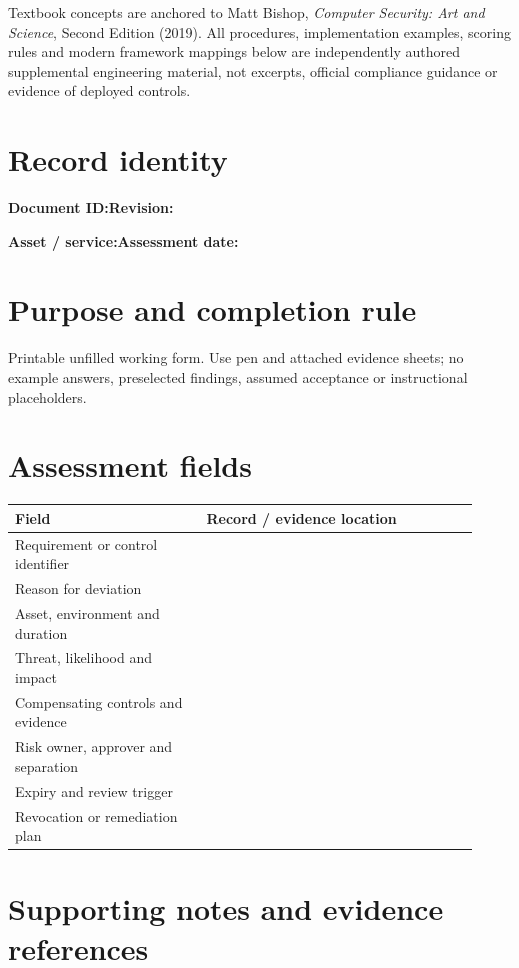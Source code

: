 \documentclass[10pt,letterpaper]{article}
\begin{document}
\makedoctocpage
\begin{notebox}
Textbook concepts are anchored to Matt Bishop, \emph{Computer Security: Art and Science}, Second Edition (2019). All procedures, implementation examples, scoring rules and modern framework mappings below are independently authored supplemental engineering material, not excerpts, official compliance guidance or evidence of deployed controls.
\end{notebox}
\section{Record identity}
\textbf{Document ID:}\enspace\hrulefill\quad\textbf{Revision:}\enspace\hrulefill
\par\medskip\textbf{Asset / service:}\enspace\hrulefill\quad\textbf{Assessment date:}\enspace\hrulefill
\section{Purpose and completion rule}
Printable unfilled working form. Use pen and attached evidence sheets; no example answers, preselected findings, assumed acceptance or instructional placeholders.
\section{Assessment fields}
\renewcommand{\arraystretch}{1.8}
\begin{longtable}{@{}p{0.38\linewidth}p{0.54\linewidth}@{}}
\toprule\textbf{Field}&\textbf{Record / evidence location}\\\midrule\endhead
Requirement or control identifier & \rule{0pt}{1.3cm}\\\midrule
Reason for deviation & \rule{0pt}{1.3cm}\\\midrule
Asset, environment and duration & \rule{0pt}{1.3cm}\\\midrule
Threat, likelihood and impact & \rule{0pt}{1.3cm}\\\midrule
Compensating controls and evidence & \rule{0pt}{1.3cm}\\\midrule
Risk owner, approver and separation & \rule{0pt}{1.3cm}\\\midrule
Expiry and review trigger & \rule{0pt}{1.3cm}\\\midrule
Revocation or remediation plan & \rule{0pt}{1.3cm}\\\midrule
\bottomrule\end{longtable}
\section{Supporting notes and evidence references}
\end{document}
